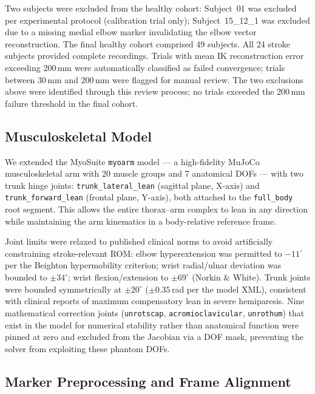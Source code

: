 \documentclass[journal,10pt,twocolumn]{IEEEtran}
\begin{document}
Two subjects were excluded from the healthy cohort: Subject~01 was excluded
per experimental protocol (calibration trial only); Subject~15\_12\_1 was
excluded due to a missing medial elbow marker invalidating the elbow vector
reconstruction. The final healthy cohort comprised 49 subjects. All 24 stroke
subjects provided complete recordings. Trials with mean IK reconstruction
error exceeding 200\,mm were automatically classified as failed convergence;
trials between 30\,mm and 200\,mm were flagged for manual review. The two
exclusions above were identified through this review process; no trials
exceeded the 200\,mm failure threshold in the final cohort.

\subsection{Musculoskeletal Model}

We extended the MyoSuite \texttt{myoarm} model \cite{caggiano2022} --- a
high-fidelity MuJoCo musculoskeletal arm with 20 muscle groups and 7
anatomical DOFs --- with two trunk hinge joints:
\texttt{trunk\_lateral\_lean} (sagittal plane, X-axis) and
\texttt{trunk\_forward\_lean} (frontal plane, Y-axis), both attached to the
\texttt{full\_body} root segment. This allows the entire thorax--arm complex
to lean in any direction while maintaining the arm kinematics in a
body-relative reference frame.

Joint limits were relaxed to published clinical norms to avoid artificially
constraining stroke-relevant ROM: elbow hyperextension was permitted to
$-11^{\circ}$ per the Beighton hypermobility criterion; wrist radial/ulnar
deviation was bounded to $\pm 34^{\circ}$; wrist flexion/extension to
$\pm 69^{\circ}$ (Norkin \& White). Trunk joints were bounded symmetrically
at $\pm 20^{\circ}$ ($\pm 0.35$\,rad per the model XML), consistent with
clinical reports of maximum compensatory lean in severe hemiparesis. Nine mathematical correction joints
(\texttt{unrotscap}, \texttt{acromioclavicular}, \texttt{unrothum}) that
exist in the model for numerical stability rather than anatomical function
were pinned at zero and excluded from the Jacobian via a DOF mask, preventing
the solver from exploiting these phantom DOFs.

\subsection{Marker Preprocessing and Frame Alignment}
\end{document}
